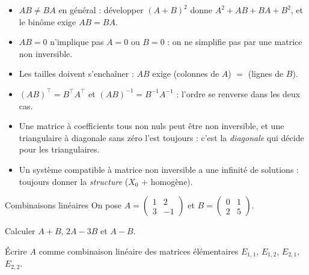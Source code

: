 \begin{attention}
\begin{itemize}[label={\color{otOrange}\textbullet},leftmargin=1.4em,itemsep=0.6mm,topsep=0.5mm]
  \item $AB\neq BA$ en général : développer $(A+B)^{2}$ donne
    $A^{2}+AB+BA+B^{2}$, et le binôme exige $AB=BA$.
  \item $AB=0$ n'implique pas $A=0$ ou $B=0$ : on ne simplifie pas par une
    matrice non inversible.
  \item Les tailles doivent s'enchaîner : $AB$ exige
    (colonnes de $A$) $=$ (lignes de $B$).
  \item $(AB)^{\top}=B^{\top}A^{\top}$ et $(AB)^{-1}=B^{-1}A^{-1}$ :
    l'ordre se renverse dans les deux cas.
  \item Une matrice à coefficients tous non nuls peut être non inversible,
    et une triangulaire à diagonale sans zéro l'est toujours : c'est la
    \emph{diagonale} qui décide pour les triangulaires.
  \item Un système compatible à matrice non inversible a une infinité de
    solutions : toujours donner la \emph{structure} ($X_0$ + homogène).
\end{itemize}
\end{attention}

\exercices
{}

\begin{exercice}[1]{Combinaisons linéaires}
On pose $A=\begin{pmatrix}1&2\\3&-1\end{pmatrix}$ et
$B=\begin{pmatrix}0&1\\2&5\end{pmatrix}$.
\begin{questions}
  \item Calculer $A+B$, $2A-3B$ et $A-B$.
  \item Écrire $A$ comme combinaison linéaire des matrices élémentaires
    $E_{1,1}$, $E_{1,2}$, $E_{2,1}$, $E_{2,2}$.
\end{questions}
\end{exercice}

